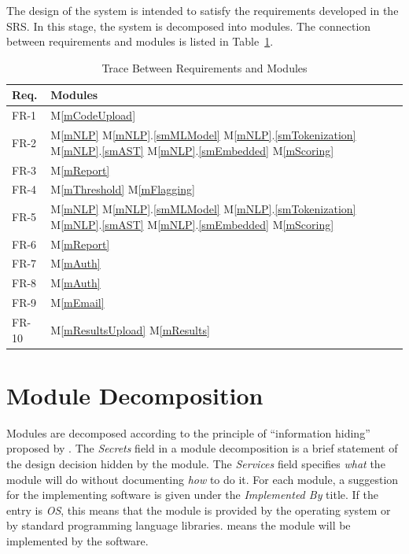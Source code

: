 \documentclass[12pt, titlepage]{article}
\newcommand{\mref}[1]{M\ref{#1}}
\newcommand{\smref}[2]{M\ref{#1}.\ref{#2}}
\begin{document}
The design of the system is intended to satisfy the requirements developed in
the SRS. In this stage, the system is decomposed into modules. The connection
between requirements and modules is listed in Table~\ref{TblRT}.
\begin{table}[H]
  \centering
  \begin{tabular}{p{} p{}}
  \toprule
  \textbf{Req.} & \textbf{Modules}\\
  \midrule
  FR-1 & \mref{mCodeUpload} \\
  FR-2 & \mref{mNLP} \smref{mNLP}{smMLModel} \smref{mNLP}{smTokenization} \smref{mNLP}{smAST} \smref{mNLP}{smEmbedded} \mref{mScoring} \\
  FR-3 & \mref{mReport}\\
  FR-4 & \mref{mThreshold} \mref{mFlagging}\\
  FR-5 & \mref{mNLP} \smref{mNLP}{smMLModel} \smref{mNLP}{smTokenization} \smref{mNLP}{smAST} \smref{mNLP}{smEmbedded} \mref{mScoring} \\
  FR-6 & \mref{mReport} \\
  FR-7 & \mref{mAuth} \\
  FR-8 & \mref{mAuth} \\
  FR-9 & \mref{mEmail} \\
  FR-10 & \mref{mResultsUpload} \mref{mResults}\\
  \bottomrule
  \end{tabular}
  \caption{Trace Between Requirements and Modules}
  \label{TblRT}
\end{table}
  


\section{Module Decomposition} \label{SecMD}

Modules are decomposed according to the principle of ``information hiding''
proposed by \citet{ParnasEtAl1984}. The \emph{Secrets} field in a module
decomposition is a brief statement of the design decision hidden by the
module. The \emph{Services} field specifies \emph{what} the module will do
without documenting \emph{how} to do it. For each module, a suggestion for the
implementing software is given under the \emph{Implemented By} title. If the
entry is \emph{OS}, this means that the module is provided by the operating
system or by standard programming language libraries.  \emph{\progname{}} means the
module will be implemented by the \progname{} software.
\end{document}
